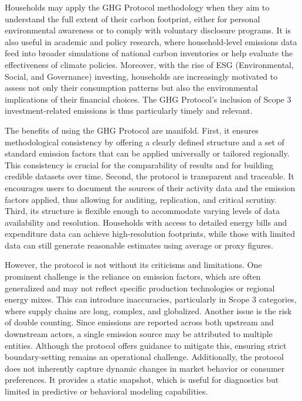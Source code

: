 \documentclass[12pt,a4paper]{article}
\begin{document}
Households may apply the GHG Protocol methodology when they aim to understand the full extent of their carbon footprint, either for personal environmental awareness or to comply with voluntary disclosure programs. It is also useful in academic and policy research, where household-level emissions data feed into broader simulations of national carbon inventories or help evaluate the effectiveness of climate policies. Moreover, with the rise of ESG (Environmental, Social, and Governance) investing, households are increasingly motivated to assess not only their consumption patterns but also the environmental implications of their financial choices. The GHG Protocol's inclusion of Scope 3 investment-related emissions is thus particularly timely and relevant.

The benefits of using the GHG Protocol are manifold. First, it ensures methodological consistency by offering a clearly defined structure and a set of standard emission factors that can be applied universally or tailored regionally. This consistency is crucial for the comparability of results and for building credible datasets over time. Second, the protocol is transparent and traceable. It encourages users to document the sources of their activity data and the emission factors applied, thus allowing for auditing, replication, and critical scrutiny. Third, its structure is flexible enough to accommodate varying levels of data availability and resolution. Households with access to detailed energy bills and expenditure data can achieve high-resolution footprints, while those with limited data can still generate reasonable estimates using average or proxy figures.

However, the protocol is not without its criticisms and limitations. One prominent challenge is the reliance on emission factors, which are often generalized and may not reflect specific production technologies or regional energy mixes. This can introduce inaccuracies, particularly in Scope 3 categories, where supply chains are long, complex, and globalized. Another issue is the risk of double counting. Since emissions are reported across both upstream and downstream actors, a single emission source may be attributed to multiple entities. Although the protocol offers guidance to mitigate this, ensuring strict boundary-setting remains an operational challenge. Additionally, the protocol does not inherently capture dynamic changes in market behavior or consumer preferences. It provides a static snapshot, which is useful for diagnostics but limited in predictive or behavioral modeling capabilities.
\end{document}
